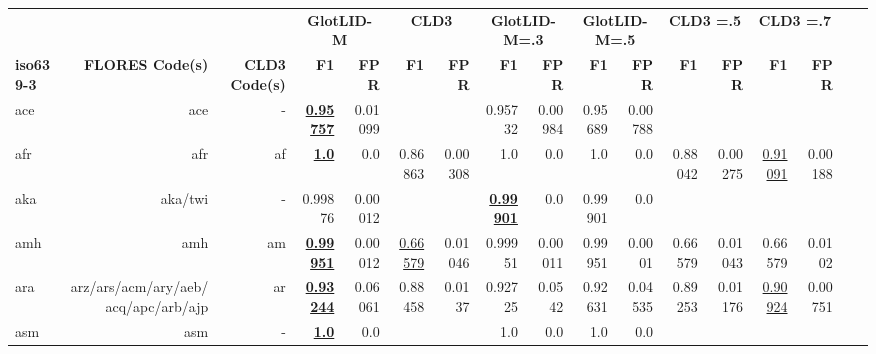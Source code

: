\documentclass[11pt]{article}
\def\modelname{\mbox{GlotLID-M}\xspace}
\def\flores{FLORES\xspace}
\begin{document}
\begin{table*}[h]
{\begin{tabular}{lrrrrrrrrrrrrrrrr}
\\
\cmidrule(lr){8-15}
& \multicolumn{2}{c}{} 
& \multicolumn{2}{c}{\textbf{\modelname}} 
& \multicolumn{2}{c}{\textbf{CLD3}}
& \multicolumn{2}{c}{\textbf{\modelname =.3}} 
& \multicolumn{2}{c}{\textbf{\modelname =.5}}
& \multicolumn{2}{c}{\textbf{CLD3  =.5}} 
& \multicolumn{2}{c}{\textbf{CLD3 =.7}}
\\
\cmidrule(lr){4-5} 
\cmidrule(lr){6-7}
\cmidrule(lr){8-9}
\cmidrule(lr){10-11}
\cmidrule(lr){12-13}
\cmidrule(lr){14-15}
\textbf{iso639-3
} & \textbf{\flores Code(s)} & \textbf{CLD3 Code(s)} & 
\textbf{F1} &
\textbf{FPR} &
\textbf{F1}  &
\textbf{FPR} &
\textbf{F1} &
\textbf{FPR} &
\textbf{F1} &
\textbf{FPR} & 
\textbf{F1} &
\textbf{FPR} &
\textbf{F1} &
\textbf{FPR}
\\
\midrule
ace         & ace         & -         & \textbf{\underline{0.95757}}         & 0.01099         &          &          & 0.95732         & 0.00984         & 0.95689         & 0.00788         &          &          &          &          \\
afr         & afr         & af         & \textbf{\underline{1.0}}         & 0.0         & 0.86863         & 0.00308         & 1.0         & 0.0         & 1.0         & 0.0         & 0.88042         & 0.00275         & \underline{0.91091}         & 0.00188         \\
aka         & aka/twi         & -         & 0.99876         & 0.00012         &          &          & \textbf{\underline{0.99901}}         & 0.0         & 0.99901         & 0.0         &          &          &          &          \\
amh         & amh         & am         & \textbf{\underline{0.99951}}         & 0.00012         & \underline{0.66579}         & 0.01046         & 0.99951         & 0.00011         & 0.99951         & 0.0001         & 0.66579         & 0.01043         & 0.66579         & 0.0102         \\
ara         & arz/ars/acm/ary/aeb/acq/apc/arb/ajp         & ar         & \textbf{\underline{0.93244}}         & 0.06061         & 0.88458         & 0.0137         & 0.92725         & 0.0542         & 0.92631         & 0.04535         & 0.89253         & 0.01176         & \underline{0.90924}         & 0.00751         \\
asm         & asm         & -         & \textbf{\underline{1.0}}         & 0.0         &          &          & 1.0         & 0.0         & 1.0         & 0.0         &          &          &          &          \\

\end{tabular}}
\end{table*}
\end{document}
